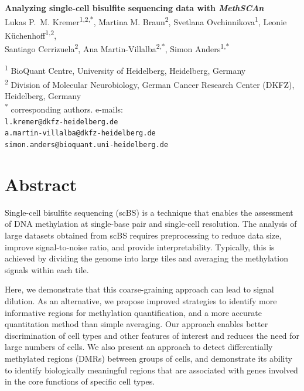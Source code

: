 \documentclass[10pt]{article}
\begin{document}
{\centering{}
\textbf{\Large Analyzing single-cell bisulfite sequencing data with \textit{MethSCAn}}\\[1.5ex]

Lukas P.~M. Kremer\textsuperscript{1,2,*},
Martina M. Braun\textsuperscript{2},
Svetlana Ovchinnikova\textsuperscript{1},
Leonie Küchenhoff\textsuperscript{1,2},\\
Santiago Cerrizuela\textsuperscript{2},
Ana Martin-Villalba\textsuperscript{2,*},
Simon Anders\textsuperscript{1,*}\\[2em]
}
\noindent\textsuperscript{1} BioQuant Centre, University of Heidelberg, Heidelberg, Germany\\
\textsuperscript{2} Division of Molecular Neurobiology, German Cancer Research Center (DKFZ), Heidelberg, Germany\\
\textsuperscript{*} corresponding authors. e-mails:\\
\texttt{l.kremer@dkfz-heidelberg.de}\\
\texttt{a.martin-villalba@dkfz-heidelberg.de}\\
\texttt{simon.anders@bioquant.uni-heidelberg.de}


\section*{Abstract}

\noindent Single-cell bisulfite sequencing (scBS) is a technique that enables the assessment of DNA methylation at single-base pair and single-cell resolution.
The analysis of large datasets obtained from scBS requires preprocessing to reduce data size, improve signal-to-noise ratio, and provide interpretability.
Typically, this is achieved by dividing the genome into large tiles and averaging the methylation signals within each tile.

Here, we demonstrate that this coarse-graining approach can lead to signal dilution.
As an alternative, we propose improved strategies to identify more informative regions for methylation quantification, and a more accurate quantitation method than simple averaging.
Our approach enables better discrimination of cell types and other features of interest and reduces the need for large numbers of cells.
We also present an approach to detect differentially methylated regions (DMRs) between groups of cells, and demonstrate its ability to identify biologically meaningful regions that are associated with genes involved in the core functions of specific cell types.
\end{document}
